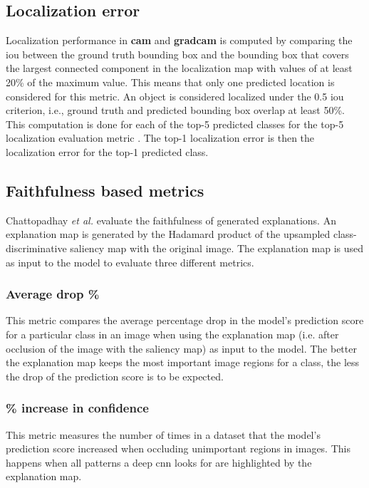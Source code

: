 \subsection{Localization error}
Localization performance in \textbf{\acrshort{cam}} \cite{zhou2016cvpr} and \textbf{\acrshort{gradcam}} \cite{selvaraju2017grad} is computed by comparing the \acrfull{iou} between the ground truth bounding box and the bounding box that covers the largest connected component in the localization map with values of at least 20\% of the maximum value. This means that only one predicted location is considered for this metric. An object is considered localized under the 0.5 \acrshort{iou} criterion, i.e., ground truth and predicted bounding box overlap at least 50\%. This computation is done for each of the top-5 predicted classes for the top-5 localization evaluation metric \cite{russakovsky2015imagenet}. The top-1 localization error is then the localization error for the top-1 predicted class.

\subsection{Faithfulness based metrics}
Chattopadhay \textit{et al.} \cite{chattopadhay2018grad} evaluate the faithfulness of generated explanations. An explanation map is generated by the Hadamard product \cite{million2007hadamard} of the upsampled class-discriminative saliency map with the original image. The explanation map is used as input to the model to evaluate three different metrics.

\subsubsection{Average drop \%}
This metric compares the average percentage drop in the model's prediction score for a particular class in an image when using the explanation map (i.e. after occlusion of the image with the saliency map) as input to the model. The better the explanation map keeps the most important image regions for a class, the less the drop of the prediction score is to be expected.

\subsubsection{\% increase in confidence}
This metric measures the number of times in a dataset that the model's prediction score increased when occluding unimportant regions in images. This happens when all patterns a deep \acrshort{cnn} looks for are highlighted by the explanation map.

